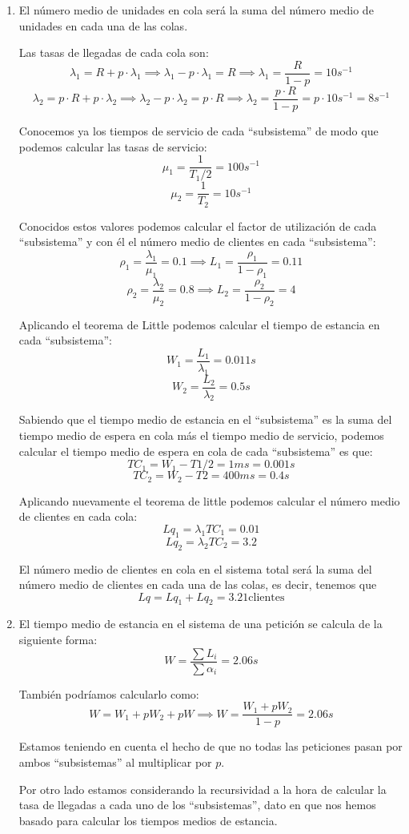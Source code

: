 \begin{problem}[17]
\begin{enumerate}
\item
El número medio de unidades en cola será la suma del número medio de unidades en cada una de las colas.

Las tasas de llegadas de cada cola son:
\[λ_1 = R + p \cdot λ_1 \implies λ_1 - p\cdot λ_1 = R \implies λ_1 = \frac{R}{1-p} = 10 s^{-1}\]
\[λ_2 = p\cdot R + p \cdot λ_2 \implies λ_2 - p\cdot λ_2 = p \cdot R \implies λ_2 = \frac{p\cdot R}{1-p} = p\cdot 10 s^{-1} = 8 s^{-1}\]

Conocemos ya los tiempos de servicio de cada ``subsistema'' de modo que podemos calcular las tasas de servicio:
\[μ_1 = \frac{1}{T_1/2}=100s^{-1}\]
\[μ_2 = \frac{1}{T_2}=10s^{-1}\]

Conocidos estos valores podemos calcular el factor de utilización de cada ``subsistema'' y con él el número medio de clientes en cada ``subsistema'':
\[ρ_1 = \frac{λ_1}{μ_1}=0.1 \implies L_1=\frac{ρ_1}{1-ρ_1} = 0.11\]
\[ρ_2 = \frac{λ_2}{μ_2}=0.8 \implies L_2=\frac{ρ_2}{1-ρ_2} = 4\]

Aplicando el teorema de Little podemos calcular el tiempo de estancia en cada ``subsistema'':
\[W_1 = \frac{L_1}{λ_1} = 0.011 s\]
\[W_2 = \frac{L_2}{λ_2} = 0.5 s\]

Sabiendo que el tiempo medio de estancia en el ``subsistema'' es la suma del tiempo medio de espera en cola más el tiempo medio de servicio, podemos calcular el tiempo medio de espera en cola de cada ``subsistema'' es que:
\[TC_1 = W_1-T1/2 = 1 ms = 0.001 s\]
\[TC_2 = W_2-T2 = 400 ms = 0.4s\]

Aplicando nuevamente el teorema de little podemos calcular el número medio de clientes en cada cola:
\[Lq_1 = λ_1TC_1 = 0.01\]
\[Lq_2 = λ_2TC_2 = 3.2\]

El número medio de clientes en cola en el sistema total será la suma del número medio de clientes en cada una de las colas, es decir, tenemos que
\[Lq = Lq_1+Lq_2 = 3.21 \text{clientes}\]

\item

El tiempo medio de estancia en el sistema de una petición se calcula de la siguiente forma:
\[W = \frac{\sum L_i}{\sum α_i}=2.06s\]

También podríamos calcularlo como:
\[W = W_1+pW_2+pW \implies W = \frac{W_1+pW_2}{1-p}=2.06s\]

Estamos teniendo en cuenta el hecho de que no todas las peticiones pasan por ambos ``subsistemas'' al multiplicar por $p$.

Por otro lado estamos considerando la recursividad a la hora de calcular la tasa de llegadas a cada uno de los ``subsistemas'', dato en que nos hemos basado para calcular los tiempos medios de estancia.


\end{enumerate}
\end{problem}

